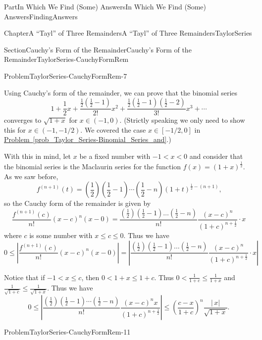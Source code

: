 \documentclass[oneside,10pt,]{book}
\newcommand{\xreffont}{\relax}
\numberwithin{equation}{part}
\newcommand{\lt}{<}
\begin{document}
\begin{partptx}{Part}{In Which We Find (Some) Answers}{}{In Which We Find (Some) Answers}{}{}{FindingAnswers}
\begin{chapterptx}{Chapter}{A ``Tayl'' of Three Remainders}{}{A ``Tayl'' of Three Remainders}{}{}{TaylorSeries}
\begin{sectionptx}{Section}{Cauchy's Form of the Remainder}{}{Cauchy's Form of the Remainder}{}{}{TaylorSeries-CauchyFormRem}
\begin{problem}{Problem}{}{TaylorSeries-CauchyFormRem-7}
\end{problem}
Using Cauchy's form of the remainder, we can prove that the binomial series%
\begin{equation*}
1+\frac{1}{2}x+\frac{\frac{1}{2}\left(\frac{1}{2}-1\right)}{2!}x^2+\frac{\frac{1}{2}\left(\frac{1}{2}-1\right)\left(\frac{1}{2}-2\right)}{3!}x^3+\cdots
\end{equation*}
converges to \(\sqrt{1+x}\) for \(x\in(-1,0).\) (Strictly speaking we only need to show this for \(x\in(-1,-1/2)\). We covered the case \(x\in [-1/2,0]\) in \hyperref[prob_Taylor_Series-Binomial_Series_and]{Problem~{\xreffont\ref{prob_Taylor_Series-Binomial_Series_and}}}.)%
\par
With this in mind, let \(x\) be a fixed number with \(-1\lt x\lt 0\) and consider that the binomial series is the Maclaurin series for the function \(f(x)=(1+x)^{\frac{1}{2}}\). As we saw before,%
\begin{equation*}
f^{(n+1)}(t)=\left(\frac{1}{2}\right)\left(\frac{1}{2}-1\right)\cdots\left(\frac{1}{2}-n\right)\left(1+t\right)^{\frac{1}{2}-(n+1)}\text{,}
\end{equation*}
so the Cauchy form of the remainder is given by%
\begin{equation*}
\frac{f^{\left(n+1\right)}\left(c\right)}{n!}{\left(x-c\right)}^n\left(x-0\right)=\frac{\left(\frac{1}{2}\right)\left(\frac{1}{2}-1\right)\dots
\left(\frac{1}{2}-n\right)}{n!}\frac{{\left(x-c\right)}^n}{{\left(1+c\right)}^{n+\frac{1}{2}}}\cdot
x
\end{equation*}
where \(c\) is some number with \(x\le c\le 0\).  Thus we have%
\begin{equation*}
0\le
\left|\frac{f^{\left(n+1\right)}\left(c\right)}{n!}{\left(x-c\right)}^n\left(x-0\right)\right|=\left|\frac{\left(\frac{1}{2}\right)\left(\frac{1}{2}-1\right)\dots
\left(\frac{1}{2}-n\right)}{n!}\frac{{\left(x-c\right)}^n}{{\left(1+c\right)}^{n+\frac{1}{2}}}\cdot
x\right|
\end{equation*}
%
\par
Notice that if \(-1\lt x\leq c\),\(\) then \(0\lt 1+x\leq 1+c\). Thus \(0\lt \frac{1}{1+c}\leq\frac{1}{1+x}\) and \(\frac{1}{\sqrt{1+c}}\leq\frac{1}{\sqrt{1+x}}\). Thus we have%
\begin{equation*}
0\leq\left|\frac{\left(\frac{1}{2}\right)\left(\frac{1}{2}-1\right)\cdots\left(\frac{1}{2}-n\right)}{n!}\frac{(x-c)^nx}{(1+c)^{n+\frac{1}{2}}}\right|\leq\left(\frac{c-x}{1+c}\right)^n\frac{|\,x|}{\sqrt{1+x}}\text{.}
\end{equation*}
%
\begin{problem}{Problem}{}{TaylorSeries-CauchyFormRem-11}%

\end{problem}
\end{sectionptx}
\end{chapterptx}
\end{partptx}
\end{document}
